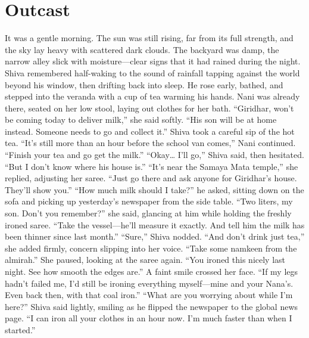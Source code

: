 \chapter{Outcast}
It was a gentle morning. The sun was still rising, far from its full strength, and the sky lay heavy with scattered dark clouds. The backyard was damp, the narrow alley slick with moisture—clear signs that it had rained during the night. Shiva remembered half-waking to the sound of rainfall tapping against the world beyond his window, then drifting back into sleep. He rose early, bathed, and stepped into the veranda with a cup of tea warming his hands. Nani was already there, seated on her low stool, laying out clothes for her bath. ``Giridhar, won't be coming today to deliver milk,'' she said softly. ``His son will be at home instead. Someone needs to go and collect it.'' Shiva took a careful sip of the hot tea. ``It's still more than an hour before the school van comes,'' Nani continued. ``Finish your tea and go get the milk.'' ``Okay… I'll go,'' Shiva said, then hesitated. ``But I don't know where his house is.'' ``It's near the Samaya Mata temple,'' she replied, adjusting her saree. ``Just go there and ask anyone for Giridhar's house. They'll show you.'' ``How much milk should I take?'' he asked, sitting down on the sofa and picking up yesterday's newspaper from the side table. ``Two liters, my son. Don't you remember?'' she said, glancing at him while holding the freshly ironed saree. ``Take the vessel—he'll measure it exactly. And tell him the milk has been thinner since last month.'' ``Sure,'' Shiva nodded. ``And don't drink just tea,'' she added firmly, concern slipping into her voice. ``Take some namkeen from the almirah.'' She paused, looking at the saree again. ``You ironed this nicely last night. See how smooth the edges are.'' A faint smile crossed her face. ``If my legs hadn't failed me, I'd still be ironing everything myself—mine and your Nana's. Even back then, with that coal iron.'' ``What are you worrying about while I'm here?'' Shiva said lightly, smiling as he flipped the newspaper to the global news page. ``I can iron all your clothes in an hour now. I'm much faster than when I started.''

